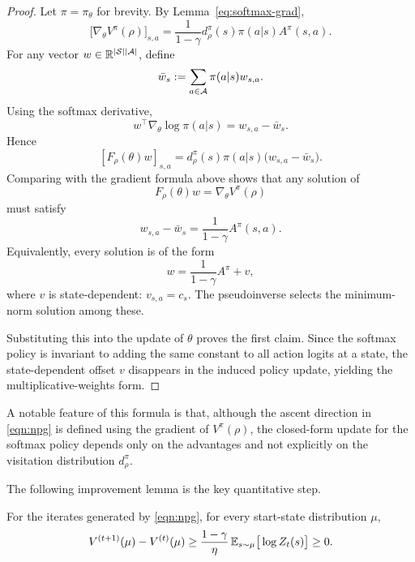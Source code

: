 \begin{proof}
Let $\pi=\pi_\theta$ for brevity. By Lemma~\ref{eq:softmax-grad},
\[
\big[\nabla_\theta V^\pi(\rho)\big]_{s,a}
=
\frac{1}{1-\gamma} d_\rho^\pi(s)\pi(a|s)A^\pi(s,a).
\]
For any vector $w\in\mathbb{R}^{|\mathcal{S}||\mathcal{A}|}$, define
\[
\bar w_s := \sum_{a\in\mathcal{A}}\pi(a|s)w_{s,a}.
\]
Using the softmax derivative,
\[
w^\top \nabla_\theta \log \pi(a|s)=w_{s,a}-\bar w_s.
\]
Hence
\[
[F_\rho(\theta)w]_{s,a}
=
d_\rho^\pi(s)\pi(a|s)\big(w_{s,a}-\bar w_s\big).
\]
Comparing with the gradient formula above shows that any solution of
\[
F_\rho(\theta)w=\nabla_\theta V^\pi(\rho)
\]
must satisfy
\[
w_{s,a}-\bar w_s = \frac{1}{1-\gamma}A^\pi(s,a).
\]
Equivalently, every solution is of the form
\[
w=\frac{1}{1-\gamma}A^\pi+v,
\]
where $v$ is state-dependent: $v_{s,a}=c_s$.
The pseudoinverse selects the minimum-norm solution among these.

Substituting this into the update of $\theta$ proves the first claim.
Since the softmax policy is invariant to adding the same constant to all action logits at
a state, the state-dependent offset $v$ disappears in the induced policy update, yielding
the multiplicative-weights form.
\end{proof}

A notable feature of this formula is that, although the ascent direction in
\eqref{eqn:npg} is defined using the gradient of $V^\pi(\rho)$, the closed-form update
for the softmax policy depends only on the advantages and not explicitly on the visitation
distribution $d_\rho^\pi$.

The following improvement lemma is the key quantitative step.

\begin{lemma}
\label{lemma:npg-gap}
For the iterates generated by \eqref{eqn:npg}, for every start-state distribution $\mu$,
\[
V^{(t+1)}(\mu)-V^{(t)}(\mu)
\ge
\frac{1-\gamma}{\eta}\,
\mathbb{E}_{s\sim \mu}\big[\log Z_t(s)\big]
\ge 0.
\]
\end{lemma}

